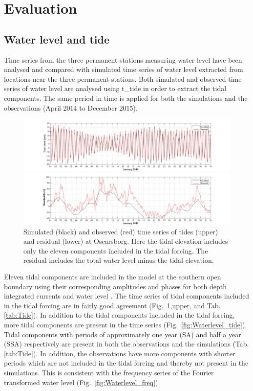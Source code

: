 \section{Evaluation}
\subsection{Water level and tide}

Time series from the three permanent stations measuring water level have been analysed and compared with simulated time series of water level extracted from locations near the three permanent stations. Both simulated and observed time series of water level are analysed using t\_tide \citep{pavlo:etal:2002} in order to extract the tidal components. The same period in time is applied for both the simulations and the observations (April 2014 to December 2015). 

\begin{figure}[hb] 
\centerline{ 
\includegraphics*[trim=3cm 0cm 2.5cm 0cm,clip=true,width=\textwidth]{Figurer/Oscarsborg_Tide_selected_jan15}  
} 
\centerline{ 
\includegraphics*[trim=3cm 0cm 2.5cm 0cm,clip=true,width=\textwidth]{Figurer/Oscarsborg_WL_rest_jan15} 
} 
\caption{\small 
Simulated (black) and observed (red) time series of tides (upper) and residual (lower) at Oscarsborg. Here the tidal elevation includes only the eleven components included in the tidal forcing. The residual includes the total water level minus the tidal elevation.} 
\label{fig:Waterlevel_jan15} 
\end{figure} 

Eleven tidal components are included in the model at the southern open boundary using their corresponding amplitudes and phases for both depth integrated currents and water level \citep{roed:etal:2016}. The time series of tidal components included in the tidal forcing are in fairly good agreement (Fig.~\ref{fig:Waterlevel_jan15},upper, and Tab.\-\ref{tab:Tide}). In addition to the tidal components included in the tidal forcing, more tidal components are present in the time series (Fig.~\ref{fig:Waterlevel_tide}). Tidal components with periods of approximately one year (SA) and half a year (SSA) respectively are present in both the observations and the simulations (Tab.\-\ref{tab:Tide}). In addition, the observations have more components with shorter periods which are not included in the tidal forcing and thereby not present in the simulations. This is consistent with the frequency series of the Fourier transformed water level (Fig.~\ref{fig:Waterlevel_freq}).

